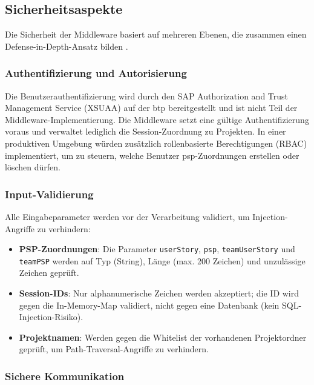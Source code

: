 \subsection{Sicherheitsaspekte}

Die Sicherheit der Middleware basiert auf mehreren Ebenen, die zusammen einen Defense-in-Depth-Ansatz bilden \citep{owasp2021}.

\subsubsection{Authentifizierung und Autorisierung}

Die Benutzerauthentifizierung wird durch den SAP Authorization and Trust Management Service (XSUAA) auf der \gls{btp} bereitgestellt und ist nicht Teil der Middleware-Implementierung. Die Middleware setzt eine gültige Authentifizierung voraus und verwaltet lediglich die Session-Zuordnung zu Projekten. In einer produktiven Umgebung würden zusätzlich rollenbasierte Berechtigungen (RBAC) implementiert, um zu steuern, welche Benutzer \gls{psp}-Zuordnungen erstellen oder löschen dürfen.

\subsubsection{Input-Validierung}

Alle Eingabeparameter werden vor der Verarbeitung validiert, um Injection-Angriffe zu verhindern:

\begin{itemize}
    \item \textbf{PSP-Zuordnungen}: Die Parameter \texttt{userStory}, \texttt{psp}, \texttt{teamUserStory} und \texttt{teamPSP} werden auf Typ (String), Länge (max. 200 Zeichen) und unzulässige Zeichen geprüft.
    \item \textbf{Session-IDs}: Nur alphanumerische Zeichen werden akzeptiert; die ID wird gegen die In-Memory-Map validiert, nicht gegen eine Datenbank (kein SQL-Injection-Risiko).
    \item \textbf{Projektnamen}: Werden gegen die Whitelist der vorhandenen Projektordner geprüft, um Path-Traversal-Angriffe zu verhindern.
\end{itemize}

\subsubsection{Sichere Kommunikation}

